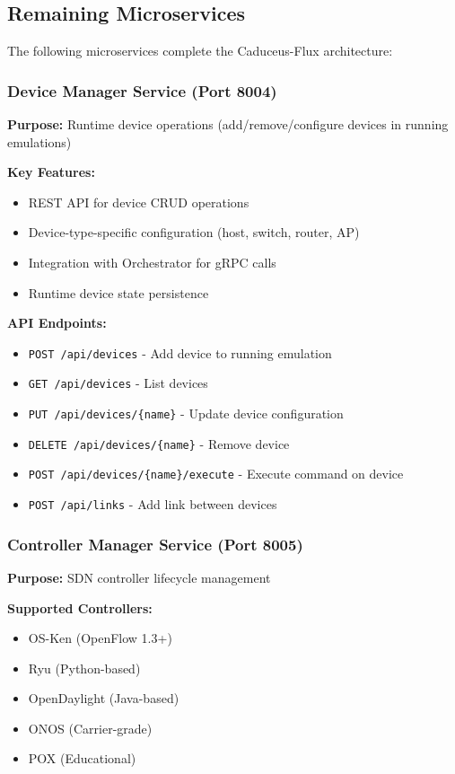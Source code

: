\documentclass[10pt,a4paper]{article}
\begin{document}
\subsection{Remaining Microservices}

The following microservices complete the Caduceus-Flux architecture:

\subsubsection{Device Manager Service (Port 8004)}
\textbf{Purpose:} Runtime device operations (add/remove/configure devices in running emulations)

\textbf{Key Features:}
\begin{itemize}
\item REST API for device CRUD operations
\item Device-type-specific configuration (host, switch, router, AP)
\item Integration with Orchestrator for gRPC calls
\item Runtime device state persistence
\end{itemize}

\textbf{API Endpoints:}
\begin{itemize}
\item \texttt{POST /api/devices} - Add device to running emulation
\item \texttt{GET /api/devices} - List devices
\item \texttt{PUT /api/devices/\{name\}} - Update device configuration
\item \texttt{DELETE /api/devices/\{name\}} - Remove device
\item \texttt{POST /api/devices/\{name\}/execute} - Execute command on device
\item \texttt{POST /api/links} - Add link between devices
\end{itemize}

\subsubsection{Controller Manager Service (Port 8005)}
\textbf{Purpose:} SDN controller lifecycle management

\textbf{Supported Controllers:}
\begin{itemize}
\item OS-Ken (OpenFlow 1.3+)
\item Ryu (Python-based)
\item OpenDaylight (Java-based)
\item ONOS (Carrier-grade)
\item POX (Educational)
\end{itemize}
\end{document}
